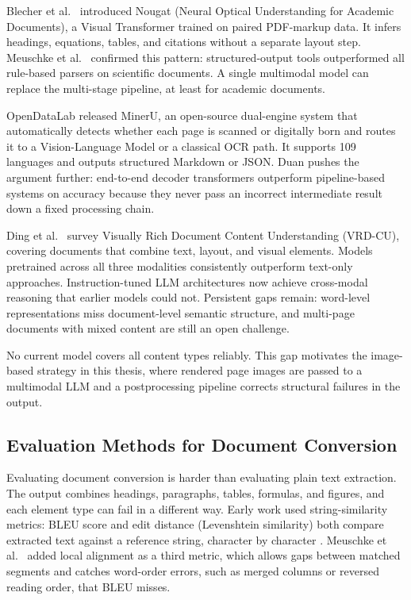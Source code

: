 \documentclass[12pt]{article}
\begin{document}
Blecher et al.\ \cite{blecher2023} introduced Nougat (Neural Optical
Understanding for Academic Documents), a Visual Transformer trained on paired
PDF-markup data. It infers headings, equations, tables, and citations without a
separate layout step. Meuschke et al.\ \cite{meuschke2023} confirmed this
pattern: structured-output tools outperformed all rule-based parsers on
scientific documents. A single multimodal model can replace the multi-stage
pipeline, at least for academic documents.

OpenDataLab \cite{mineru_software} released MinerU, an open-source dual-engine
system that automatically detects whether each page is scanned or digitally born
and routes it to a Vision-Language Model or a classical OCR path. It supports
109 languages and outputs structured Markdown or JSON. Duan \cite{duan2025}
pushes the argument further:
end-to-end decoder transformers outperform pipeline-based systems on accuracy
because they never pass an incorrect intermediate result down a fixed processing
chain.

Ding et al.\ \cite{ding2026} survey Visually Rich Document Content Understanding
(VRD-CU), covering documents that combine text, layout, and visual elements.
Models pretrained across all three modalities consistently outperform text-only
approaches. Instruction-tuned LLM architectures now achieve cross-modal reasoning
that earlier models could not. Persistent gaps remain: word-level representations
miss document-level semantic structure, and multi-page documents with mixed
content are still an open challenge.

No current model covers all content types reliably. This gap motivates the
image-based strategy in this thesis, where rendered page images are passed to a
multimodal LLM and a postprocessing pipeline corrects structural failures in the
output.

\subsection{Evaluation Methods for Document Conversion}

Evaluating document conversion is harder than evaluating plain text extraction.
The output combines headings, paragraphs, tables, formulas, and figures, and each
element type can fail in a different way. Early work used string-similarity
metrics: BLEU score and edit distance (Levenshtein similarity) both compare
extracted text against a reference string, character by character
\cite{papineni2002}. Meuschke et al.\ \cite{meuschke2023} added local
alignment as a third metric, which allows gaps between matched segments and
catches word-order errors, such as merged columns or reversed reading order, that
BLEU misses.
\end{document}
